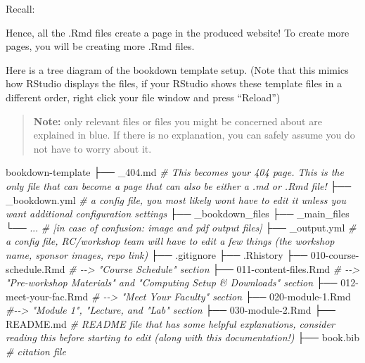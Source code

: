 \documentclass[
]{book}
\newenvironment{Shaded}{\begin{snugshade}}{\end{snugshade}}
\newcommand{\CommentTok}[1]{\textcolor[rgb]{0.56,0.35,0.01}{\textit{#1}}}
\newcommand{\ExtensionTok}[1]{#1}
\newcommand{\NormalTok}[1]{#1}
\theoremstyle{definition}
\theoremstyle{definition}
\theoremstyle{definition}
\theoremstyle{definition}
\theoremstyle{remark}
\begin{document}
Recall:

Hence, all the .Rmd files create a page in the produced website! To create more pages, you will be creating more .Rmd files.

Here is a tree diagram of the bookdown template setup. (Note that this mimics how RStudio displays the files, if your RStudio shows these template files in a different order, right click your file window and press ``Reload'')

\begin{quote}
\textbf{Note:} only relevant files or files you might be concerned about are explained in blue. If there is no explanation, you can safely assume you do not have to worry about it.
\end{quote}

\begin{Shaded}
\begin{Highlighting}[]
\ExtensionTok{bookdown{-}template}
\ExtensionTok{├──}\NormalTok{ \_404.md }\CommentTok{\# This becomes your 404 page. This is the only file that can become a page that can also be either a .md or .Rmd file!}
\ExtensionTok{├──}\NormalTok{ \_bookdown.yml }\CommentTok{\# a config file, you most likely won\textquotesingle{}t have to edit it unless you want additional configuration settings}
\ExtensionTok{├──}\NormalTok{ \_bookdown\_files}
\ExtensionTok{├──}\NormalTok{ \_main\_files}
    \ExtensionTok{└──}\NormalTok{ ... }\CommentTok{\# [in case of confusion: image and pdf output files]}
\ExtensionTok{├──}\NormalTok{ \_output.yml }\CommentTok{\# a config file, RC/workshop team will have to edit a few things (the workshop name, sponsor images, repo link)}
\ExtensionTok{├──}\NormalTok{ .gitignore}
\ExtensionTok{├──}\NormalTok{ .Rhistory}
\ExtensionTok{├──}\NormalTok{ 010{-}course{-}schedule.Rmd }\CommentTok{\# {-}{-}\textgreater{} "Course Schedule" section}
\ExtensionTok{├──}\NormalTok{ 011{-}content{-}files.Rmd }\CommentTok{\# {-}{-}\textgreater{} "Pre{-}workshop Materials" and "Computing Setup \& Downloads" section}
\ExtensionTok{├──}\NormalTok{ 012{-}meet{-}your{-}fac.Rmd }\CommentTok{\# {-}{-}\textgreater{} "Meet Your Faculty" section}
\ExtensionTok{├──}\NormalTok{ 020{-}module{-}1.Rmd }\CommentTok{\#{-}{-}\textgreater{} "Module 1", "Lecture, and "Lab" section}
\ExtensionTok{├──}\NormalTok{ 030{-}module{-}2.Rmd}
\ExtensionTok{├──}\NormalTok{ README.md }\CommentTok{\# README file that has some helpful explanations, consider reading this before starting to edit (along with this documentation!)}
\ExtensionTok{├──}\NormalTok{ book.bib }\CommentTok{\# citation file}

\end{Highlighting}
\end{Shaded}
\end{document}
